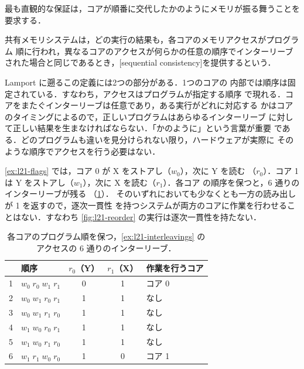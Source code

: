 \documentclass[../main.tex]{subfiles}
\begin{document}
最も直観的な保証は，コアが順番に交代したかのようにメモリが振る舞うことを
要求する．

\begin{definition}[逐次一貫性]
  共有メモリシステムは，どの実行の結果も，各コアのメモリアクセスがプログラム
  順に行われ，異なるコアのアクセスが何らかの任意の順序でインターリーブ
  された場合と同じであるとき，[sequential consistency]を提供するという．
\end{definition}

Lamport \cite{lamport1979} に遡るこの定義には2つの部分がある．1つのコアの
内部では順序は固定されている．すなわち，アクセスはプログラムが指定する順序
で現れる．コアをまたぐインターリーブは任意であり，ある実行がどれに対応する
かはコアのタイミングによるので，正しいプログラムはあらゆるインターリーブ
に対して正しい結果を生まなければならない．「かのように」という言葉が重要
である．どのプログラムも違いを見分けられない限り，ハードウェアが実際に
そのような順序でアクセスを行う必要はない．

\begin{example}[2つのフラグのプログラムのインターリーブ]
  \label{ex:l21-interleavings}
  \cref{ex:l21-flags} では，コア 0 が X をストアし（$w_0$），次に Y を読む
  （$r_0$）．コア 1 は Y をストアし（$w_1$），次に X を読む（$r_1$）．各コア
  の順序を保つと，6 通りのインターリーブが残る
  （\cref{tab:l21-interleavings}）．
  そのいずれにおいても少なくとも一方の読み出しが 1 を返すので，逐次一貫性
  を持つシステムが両方のコアに作業を行わせることはない．すなわち
  \cref{fig:l21-reorder} の実行は逐次一貫性を持たない．
\end{example}

\begin{table}[htbp]
  \centering\small
  \caption{各コアのプログラム順を保つ，\cref{ex:l21-interleavings} の
    アクセスの 6 通りのインターリーブ．}
  \label{tab:l21-interleavings}
  \begin{tabular}{@{}clccl@{}}
    \toprule
    & 順序 & $r_0$（Y） & $r_1$（X） & 作業を行うコア \\
    \midrule
    1 & $w_0\;r_0\;w_1\;r_1$ & 0 & 1 & コア 0 \\
    2 & $w_0\;w_1\;r_0\;r_1$ & 1 & 1 & なし \\
    3 & $w_0\;w_1\;r_1\;r_0$ & 1 & 1 & なし \\
    4 & $w_1\;w_0\;r_0\;r_1$ & 1 & 1 & なし \\
    5 & $w_1\;w_0\;r_1\;r_0$ & 1 & 1 & なし \\
    6 & $w_1\;r_1\;w_0\;r_0$ & 1 & 0 & コア 1 \\
    \bottomrule
  \end{tabular}
\end{table}
\end{document}

